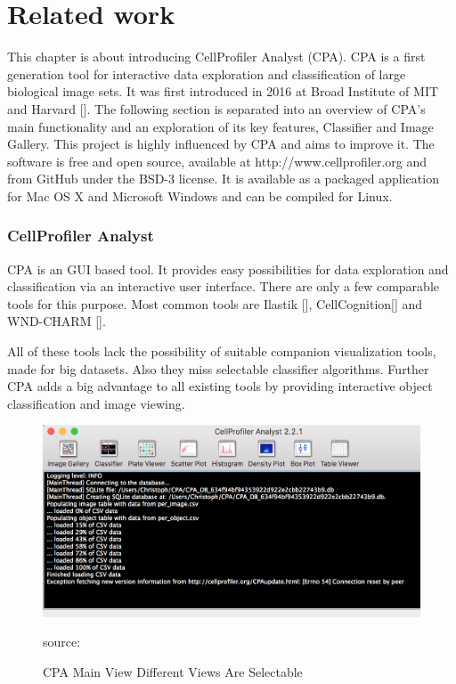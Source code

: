 \chapter{Related work}
This chapter is about introducing CellProfiler Analyst (CPA). CPA is a first generation tool for interactive data exploration and classification of large biological image sets. 
It was first introduced in 2016 at Broad Institute of MIT and Harvard []. The following section is separated into an overview of CPA's main functionality and an exploration of its key features, Classifier and Image Gallery. This project is highly influenced by CPA and aims to improve it. The software is free and open source, available at http://www.cellprofiler.org and from GitHub under the BSD-3 license. It is available as a packaged application for
Mac OS X and Microsoft Windows and can be compiled for Linux.

\subsection{CellProfiler Analyst}
CPA is an GUI based tool. It provides easy possibilities for data exploration and classification via an interactive user interface. There are only a few comparable tools for this purpose. Most common tools are Ilastik [], CellCognition[] and WND-CHARM [].

All of these tools lack the possibility of suitable companion visualization tools, made for big datasets. Also they miss selectable classifier algorithms. Further CPA adds a big advantage to all existing tools by providing interactive object classification and image viewing.

\begin{figure}[H]
	\centering
	\includegraphics[width=0.8\linewidth]{bilder/related_work/cpa_main_view.png}
	\caption{CPA Main View Different Views Are Selectable} source:\cite{ReactLogo}
	\label{fig:RL}
\end{figure}

